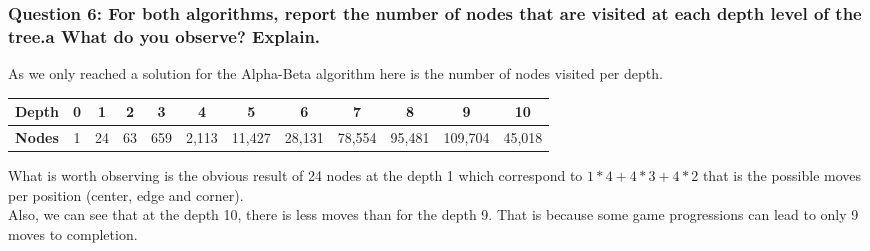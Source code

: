 \documentclass[a4paper,10pt]{article}
\begin{document}
			\subsubsection{Question 6: For both algorithms, report the number of nodes that are visited at each depth level of the tree.a What do you observe? Explain.}
				As we only reached a solution for the Alpha-Beta algorithm here is the number of nodes visited per depth.\\
				\begin{center}
					\begin{tabular}{|c|c|c|c|c|c|c|c|c|c|c|c|}
						\hline 
						\textbf{Depth} & 0 & 1 & 2 & 3 & 4 & 5 & 6 & 7 & 8 & 9 & 10 \\ 
						\hline 
						\textbf{Nodes} & 1 & 24 & 63 & 659 & 2,113 & 11,427 & 28,131 & 78,554 & 95,481 & 109,704 & 45,018 \\ 
						\hline 
					\end{tabular} 
				\end{center}
				What is worth observing is the obvious result of 24 nodes at the depth 1 which correspond to $ 1*4 + 4*3 + 4*2 $ that is the possible moves per position (center, edge and corner).\\
				Also, we can see that at the depth 10, there is less moves than for the depth 9. That is because some game progressions can lead to only 9 moves to completion.
\end{document}
